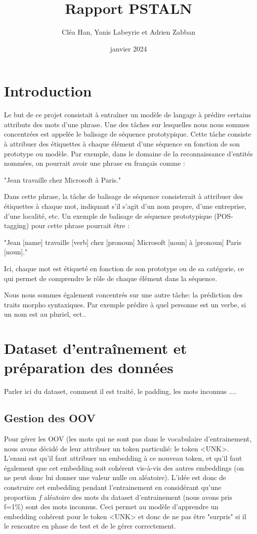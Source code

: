 \documentclass[a4paper]{article}
\title{Rapport PSTALN}
\author{Cléa Han, Yanis Labeyrie et Adrien Zabban}
\date{janvier 2024}
\begin{document}
\maketitle

\section{Introduction}

Le but de ce projet consistait à entraîner un modèle de langage à prédire certains attributs des mots d'une phrase. Une des tâches sur lesquelles nous nous sommes concentrées est appelée le balisage de séquence prototypique. Cette tâche consiste à attribuer des étiquettes à chaque élément d'une séquence en fonction de son prototype ou modèle. Par exemple, dans le domaine de la reconnaissance d'entités nommées, on pourrait avoir une phrase en français comme :

"Jean travaille chez Microsoft à Paris."

Dans cette phrase, la tâche de balisage de séquence consisterait à attribuer des étiquettes à chaque mot, indiquant s'il s'agit d'un nom propre, d'une entreprise, d'une localité, etc. Un exemple de balisage de séquence prototypique (POS-tagging) pour cette phrase pourrait être :

"Jean [name] travaille [verb] chez [pronoun] Microsoft [noun] à [pronoun] Paris [noun]."

Ici, chaque mot est étiqueté en fonction de son prototype ou de sa catégorie, ce qui permet de comprendre le rôle de chaque élément dans la séquence. 

Nous nous sommes également concentrés sur une autre tâche: la prédiction des traits morpho syntaxiques. Par exemple prédire à quel personne est un verbe, si un nom est au pluriel, ect..


\section{Dataset d'entraînement et préparation des données}

Parler ici du dataset, comment il est traité, le padding, les mots inconnus ....

\subsection{Gestion des OOV}

Pour gérer les OOV (les mots qui ne sont pas dans le vocabulaire d'entrainement, nous avons décidé de leur attribuer un token particulié: le token <UNK>. L'ennui est qu'il faut attribuer un embedding à ce nouveau token, et qu'il faut également que cet embedding soit cohérent vis-à-vis des autres embeddings (on ne peut donc lui donner une valeur nulle ou aléatoire). L'idée est donc de construire cet embedding pendant l'entrainement en considérant qu'une proportion $f$ aléatoire des mots du dataset d'entrainement (nous avons pris f=1\%) sont des mots inconnus. Ceci permet au modèle d'apprendre un embedding cohérent pour le token <UNK> et donc de ne pas être "surpris" si il le rencontre en phase de test et de le gérer correctement.
\end{document}
